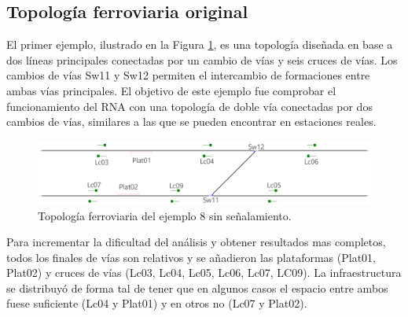 \subsection{Topología ferroviaria original}

	El primer ejemplo, ilustrado en la Figura \ref{fig:EJ8_1}, es una topología diseñada en base a dos líneas principales conectadas por un cambio de vías y seis cruces de vías. Los cambios de vías Sw11 y Sw12 permiten el intercambio de formaciones entre ambas vías principales. El objetivo de este ejemplo fue comprobar el funcionamiento del RNA con una topología de doble vía conectadas por dos cambios de vías, similares a las que se pueden encontrar en estaciones reales.
	
	\begin{figure}[h]
		\centering
		\includegraphics[width=1\textwidth]{resultados-obtenidos/ejemplo8/images/8_empty.png}
		\centering\caption{Topología ferroviaria del ejemplo 8 sin señalamiento.}
		\label{fig:EJ8_1}
	\end{figure}
	
	Para incrementar la dificultad del análisis y obtener resultados mas completos, todos los finales de vías son relativos y se añadieron las plataformas (Plat01, Plat02) y cruces de vías (Lc03, Lc04, Lc05, Lc06, Lc07, LC09). La infraestructura se distribuyó de forma tal de tener que en algunos casos el espacio entre ambos fuese suficiente (Lc04 y Plat01) y en otros no (Lc07 y Plat02).
